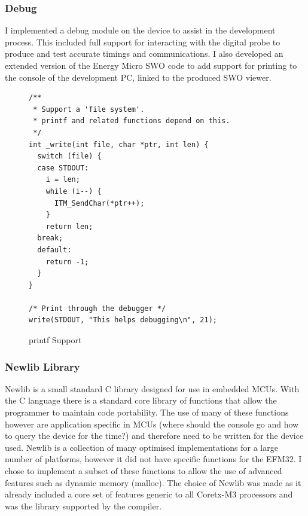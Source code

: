 \subsubsection{Debug}
I implemented a debug module on the device to assist in the development process. This included full
support for interacting with the digital probe to produce and test accurate timings and
communications. I also developed an extended version of the Energy Micro \ac{SWO} code to add
support for printing to the console of the development PC, linked to the produced \ac{SWO} viewer.

\begin{figure}
  \vspace{-10pt}
  \begin{center}
    \lstset{language=[ANSI]C}
    \begin{lstlisting}
/**
 * Support a 'file system'.
 * printf and related functions depend on this.
 */
int _write(int file, char *ptr, int len) {
  switch (file) {
  case STDOUT:
    i = len;
    while (i--) {
      ITM_SendChar(*ptr++);
    }
    return len;
  break;
  default:
    return -1;
  }
}

/* Print through the debugger */
write(STDOUT, "This helps debugging\n", 21);
    \end{lstlisting}
    \caption[printf Support]{printf Support}
  \end{center}
  \vspace{-10pt}
\end{figure}

\subsubsection{Newlib Library}
Newlib is a small standard C library designed for use in embedded \acp{MCU}. With the C language there
is a standard core library of functions that allow the programmer to maintain code portability. The
use of many of these functions however are application specific in \acp{MCU} (\eg where should the
console go and how to query the device for the time?) and therefore need to be written for the
device used. Newlib is a collection of many optimised implementations for a large number of
platforms, however it did not have specific functions for the EFM32. I chose to implement a subset
of these functions to allow the use of advanced features such as dynamic memory (\ie malloc). The
choice of Newlib was made as it already included a core set of features generic to all Coretx-M3
processors and was the library supported by the compiler.

